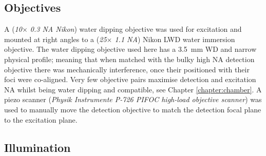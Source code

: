 
\subsection{Objectives}


A (\emph{10$\times$ 0.3 NA Nikon}) water dipping objective was used for excitation and mounted at right angles to a (\emph{25$\times$ 1.1 NA}) Nikon LWD water immersion objective.
The water dipping objective used here has a \SI{3.5}{\milli\meter} WD and narrow physical profile; meaning that when matched with the bulky high NA detection objective there was mechanically interference, once their positioned with their foci were co-aligned.
Very few objective pairs maximise detection and excitation NA whilst being water dipping and compatible, see Chapter \ref{chapter:chamber}.
A piezo scanner (\emph{Physik Instrumente P-726 PIFOC high-load objective scanner}) was used to manually move the detection objective to match the detection focal plane to the excitation plane.

\subsection{Illumination}

